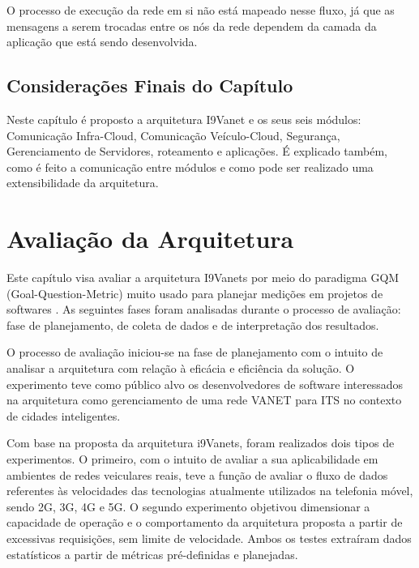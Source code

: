 \documentclass[
	12pt,				%
	oneside,			%
	a4paper,			%
	english,			%
	brazil				%
	]{abntex2ppgsi}
\begin{document}
O processo de execução da rede em si não está mapeado nesse fluxo, já que as mensagens a serem trocadas entre os nós da rede dependem da camada da aplicação que está sendo desenvolvida.

\section{Considerações Finais do Capítulo}
Neste capítulo é proposto a arquitetura I9Vanet e os seus seis módulos: Comunicação Infra-Cloud, Comunicação Veículo-Cloud, Segurança, Gerenciamento de Servidores, roteamento e aplicações. É explicado também, como é feito a comunicação entre módulos e como pode ser realizado uma extensibilidade da arquitetura.

\chapter{Avaliação da Arquitetura}\label{sec:avaliacaoArquitetura}


Este capítulo visa avaliar a arquitetura I9Vanets  por meio do paradigma GQM (Goal-Question-Metric) muito usado para planejar medições em projetos de softwares \cite{van2002goal}. As seguintes fases foram analisadas durante o processo de avaliação: fase de planejamento, de coleta de dados e de interpretação dos resultados.

O processo de avaliação iniciou-se na fase de planejamento com o intuito de analisar a arquitetura com relação à eficácia e eficiência da solução. O experimento teve como público alvo os desenvolvedores de software interessados na arquitetura como gerenciamento de uma rede VANET para ITS no contexto de cidades inteligentes.

Com base na proposta da arquitetura i9Vanets, foram realizados dois tipos de experimentos. O primeiro, com o intuito de avaliar a sua aplicabilidade em ambientes de redes veiculares reais, teve a função de avaliar o fluxo de dados referentes às velocidades das tecnologias atualmente utilizados na telefonia móvel, sendo 2G, 3G, 4G e 5G. O segundo experimento objetivou dimensionar a capacidade de operação e o comportamento da arquitetura proposta a partir de excessivas requisições, sem limite de velocidade. Ambos os testes extraíram dados estatísticos a partir de métricas pré-definidas e planejadas.
\end{document}

